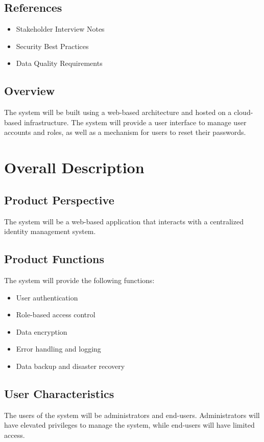\documentclass{article}
\begin{document}
\subsection{References}
\begin{itemize}
\item Stakeholder Interview Notes
\item Security Best Practices
\item Data Quality Requirements
\end{itemize}

\subsection{Overview}
The system will be built using a web-based architecture and hosted on a cloud-based infrastructure. The system will provide a user interface to manage user accounts and roles, as well as a mechanism for users to reset their passwords.

\section{Overall Description}
\subsection{Product Perspective}
The system will be a web-based application that interacts with a centralized identity management system.

\subsection{Product Functions}
The system will provide the following functions:
\begin{itemize}
\item User authentication
\item Role-based access control
\item Data encryption
\item Error handling and logging
\item Data backup and disaster recovery
\end{itemize}

\subsection{User Characteristics}
The users of the system will be administrators and end-users. Administrators will have elevated privileges to manage the system, while end-users will have limited access.
\end{document}
